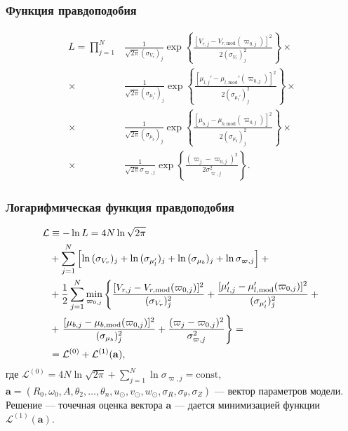 \documentclass{beamer}
\begin{document}
\begin{frame}
\frametitle{Функция правдоподобия}
\vspace{-2em}
\begin{align}
  \nonumber
  L = \prod_{j = 1}^N & \frac{1}{\sqrt{2 \pi} (\sigma_{V_r})_j} \exp{\left\{ \frac{[ V_{r,j} - V_{r,\mathrm{mod}} (\varpi_{0,j}) ]^2}{2 (\sigma_{V_r})_j^2} \right\}} \times {}\\
  \nonumber
  {} \times {} & \frac{1}{\sqrt{2 \pi} (\sigma_{\mu_l'})_j} \exp{\left\{ \frac{[ \mu_{l,j}' - \mu_{l,\mathrm{mod}}' (\varpi_{0,j}) ]^2}{2 (\sigma_{\mu_l'})_j^2} \right\}} \times {}\\
  \nonumber
  {} \times {} & \frac{1}{\sqrt{2 \pi} (\sigma_{\mu_b})_j} \exp{\left\{ \frac{[ \mu_{b,j} - \mu_{b,\mathrm{mod}} (\varpi_{0,j}) ]^2}{2 (\sigma_{\mu_b})_j^2} \right\}} \times {}\\
  {} \times {} & \frac{1}{\sqrt{2 \pi} \sigma_{\varpi,j}} \exp{\left\{ \frac{(\varpi_j - \varpi_{0,j})^2}{2 \sigma_{\varpi,j}^2} \right\}}.
\end{align}
\end{frame}

\begin{frame}
\frametitle{Логарифмическая функция правдоподобия}
\vspace{-2em}
\begin{align}
  \nonumber
  \mathcal{L} &\equiv -\ln{L} = 4 N \ln{\sqrt{2 \pi}}\\
  \nonumber
  &+ \sum_{j=1}^N \left[ \ln{(\sigma_{V_r})_j} + \ln{(\sigma_{\mu_l'})_j} + \ln{(\sigma_{\mu_b})_j} + \ln{\sigma_{\varpi,j}} \right] + {}\\
  \nonumber
  &+ \frac{1}{2} \sum_{j=1}^N \min_{\varpi_{0,j}} \left\{ \frac{[ V_{r,j} - V_{r,\mathrm{mod}}(\varpi_{0,j}) ]^2}{(\sigma_{V_r})_j^2} + \frac{[ \mu_{l,j}' - \mu_{l,\mathrm{mod}}'(\varpi_{0,j}) ]^2}{(\sigma_{\mu_l'})_j^2} + {} \right.\\
  \nonumber
  &+ \left. \frac{[ \mu_{b,j} - \mu_{b,\mathrm{mod}}(\varpi_{0,j}) ]^2}{(\sigma_{\mu_b})_j^2} + \frac{( \varpi_j - \varpi_{0,j} )^2}{\sigma_{\varpi,j}^2} \vphantom{\frac{[ \mu_{l,j}' - \mu_{l,\mathrm{mod}}'(\varpi_{0,j}) ]^2}{(\sigma_{\mu_l'})_j^2}} \right\} = {}\\
  &= \mathcal{L}^{(0)} + \mathcal{L}^{(1)}(\mathbf{a}),
\end{align}
%
где $ \mathcal{L}^{(0)} = 4 N \ln{\sqrt{2 \pi}} + \sum_{j=1}^N \ln{\sigma_{\varpi,j}} = \mathrm{const} $, $ \mathbf{a} = (R_0, \omega_0, A, \theta_2, \ldots, \theta_n, u_\odot, v_\odot, w_\odot, \sigma_R, \sigma_\theta, \sigma_Z) $ --- вектор параметров модели. Решение --- точечная оценка вектора $ \mathbf{a} $ --- дается минимизацией функции $ \mathcal{L}^{(1)}(\mathbf{a}) $.
\end{frame}
\end{document}

